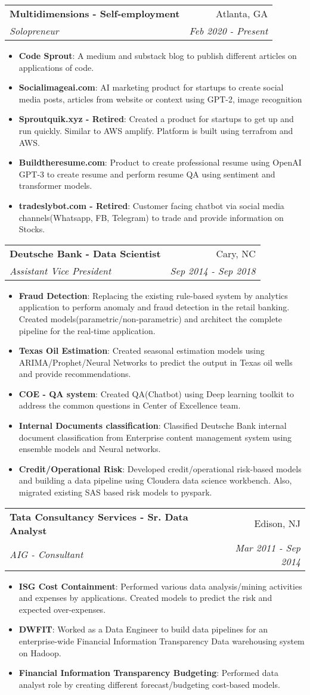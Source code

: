 \documentclass[letterpaper,11pt]{article}
\makeatletter
\newcommand{\resumeItem}[2]{
  \item\small{
    \textbf{#1}{: #2 \vspace{-2pt}}
    }
  }
\newcommand{\resumeSubheading}[4]{
    \vspace{-1pt}\item
    \begin{tabular*}{0.97\textwidth}[t]{l@{\extracolsep{\fill}}r}
    \textbf{#1} & #2 \\
      \textit{\small#3} & \textit{\small #4} \\
        \end{tabular*}\vspace{-5pt}
      }
\newcommand{\resumeItemListStart}{\begin{itemize}}
\newcommand{\resumeItemListEnd}{\end{itemize}\vspace{-5pt}}
\makeatother
\begin{document}
        \resumeSubheading
        {Multidimensions - Self-employment }{Atlanta, GA}
        {Solopreneur}{Feb 2020 - Present}
         \resumeItemListStart
          \resumeItem{Code Sprout}
        {A medium and substack blog to publish different articles on applications of code.}
        \resumeItem{Socialimageai.com}
        {AI marketing product for startups to create social media posts, articles from website or context using GPT-2, image recognition }
        \resumeItem{Sproutquik.xyz - Retired}
        {Created a product for startups to get up and run quickly. Similar to AWS amplify. Platform is built using terrafrom and AWS. }
         \resumeItem{Buildtheresume.com}
        {Product to create professional resume using OpenAI GPT-3 to create resume and perform resume QA using sentiment and transformer models. }
        
        \resumeItem{tradeslybot.com - Retired}
        {Customer facing chatbot via social media channels(Whatsapp, FB, Telegram) to trade and provide information on Stocks. }
         \resumeItemListEnd


        \resumeSubheading
        {Deutsche Bank - Data Scientist}{Cary, NC}
        {Assistant Vice President}{Sep 2014 - Sep 2018}
        \resumeItemListStart
        \resumeItem{Fraud Detection}
        {Replacing the existing rule-based system by analytics application to perform anomaly and fraud detection in the retail banking. Created models(parametric/non-parametric) and architect the
complete pipeline for the real-time application.}
        \resumeItem{Texas Oil Estimation}
        {Created seasonal estimation models using ARIMA/Prophet/Neural Networks to predict
the output in Texas oil wells and provide recommendations.}
                \resumeItem{COE - QA system}
        {Created QA(Chatbot) using Deep learning toolkit to address the common questions in
Center of Excellence team.}
                \resumeItem{Internal Documents classification}
        {Classified Deutsche Bank internal document classification from Enterprise
content management system using ensemble models and Neural networks.}
                \resumeItem{Credit/Operational Risk}
        {Developed credit/operational risk-based models and building a data pipeline using
Cloudera data science workbench. Also, migrated existing SAS based risk models to pyspark.}
        \resumeItemListEnd
        
        \resumeSubheading
        {Tata Consultancy Services - Sr. Data Analyst}{Edison, NJ}
        {AIG - Consultant}{Mar 2011 - Sep 2014}
        \resumeItemListStart
        \resumeItem{ISG Cost Containment}
        {Performed various data analysis/mining activities and expenses by applications.
Created models to predict the risk and expected over-expenses.}
        \resumeItem{DWFIT}
        {Worked as a Data Engineer to build data pipelines for an enterprise-wide Financial Information
Transparency Data warehousing system on Hadoop.}
        \resumeItem{Financial Information Transparency Budgeting}
        {Performed data analyst role by creating different forecast/budgeting cost-based models.}
  \resumeItemListEnd
  
\end{document}

